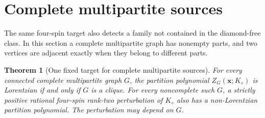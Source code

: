 \documentclass[11pt]{article}
\newtheorem{theorem}{Theorem}
\theoremstyle{remark}
\begin{document}
\section{Complete multipartite sources}
The same four-spin target also detects a family not contained in the
diamond-free class. In this section a complete multipartite graph has
nonempty parts, and two vertices are adjacent exactly when they belong
to different parts.

\begin{theorem}[One fixed target for complete multipartite sources]
\label{thm:multipartite}
For every connected complete multipartite graph $G$, the partition
polynomial $Z_G(\mathbf x;K_{\diamond})$ is Lorentzian if and only
if $G$ is a clique. For every noncomplete such $G$, a strictly positive
rational four-spin rank-two perturbation of $K_{\diamond}$ also has
a non-Lorentzian partition polynomial. The perturbation may depend on $G$.
\end{theorem}
\end{document}

